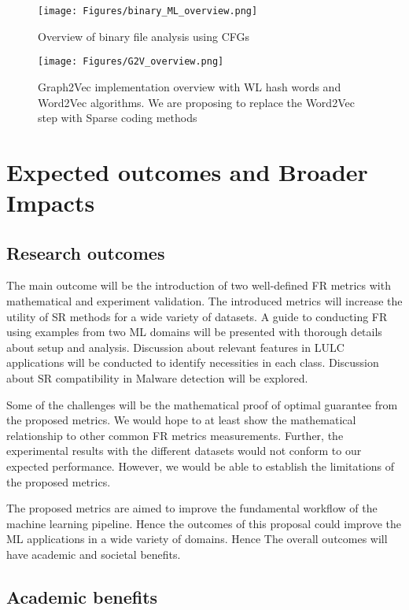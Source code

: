 \begin{figure*}[!t]%
\centering
\texttt{[image: Figures/binary\_ML\_overview.png]}
\caption{Overview of binary file analysis using CFGs}%
\label{fig: binary_ML}%
\end{figure*}

\begin{figure*}[!t]%
\centering
\texttt{[image: Figures/G2V\_overview.png]}
\caption{Graph2Vec implementation overview with WL hash words and Word2Vec algorithms. We are proposing to replace the Word2Vec step with Sparse coding methods}%
\label{fig: G2V}%
\end{figure*}

\section{Expected outcomes and Broader Impacts}

\subsection{Research outcomes}

The main outcome will be the introduction of two well-defined FR metrics with mathematical and experiment validation. The introduced metrics will increase the utility of SR methods for a wide variety of datasets. A guide to conducting FR using examples from two ML domains will be presented with thorough details about setup and analysis. Discussion about relevant features in LULC applications will be conducted to identify necessities in each class. Discussion about SR compatibility in Malware detection will be explored. 

Some of the challenges will be the mathematical proof of optimal guarantee from the proposed metrics. We would hope to at least show the mathematical relationship to other common FR metrics measurements. Further, the experimental results with the different datasets would not conform to our expected performance. However, we would be able to establish the limitations of the proposed metrics. 

The proposed metrics are aimed to improve the fundamental workflow of the machine learning pipeline. Hence the outcomes of this proposal could improve the ML applications in a wide variety of domains. Hence The overall outcomes will have academic and societal benefits.     
\subsection{Academic benefits}

